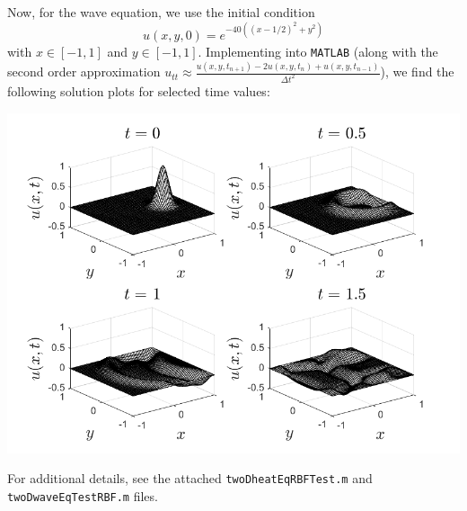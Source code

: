 \documentclass{article}
\begin{document}
\begin{itemize}
\begin{center}
    \end{center}
    Now, for the wave equation, we use the initial condition 
    \[u(x,y,0) = e^{-40((x - 1/2)^2 + y^2)}\]
    with $x \in [-1, 1]$ and $y \in [-1,1]$.
    \newline
    Implementing into \verb+MATLAB+ (along with the second order approximation $u_{tt} \approx \frac{u(x,y,t_{n+1}) - 2u(x,y,t_n) + u(x,y,t_{n-1})}{\Delta t^2}$), we find the following solution plots for selected time values:
    \begin{center}
        \includegraphics[scale = 0.5]{waveEq_RBF_PS.png}
    \end{center}
    For additional details, see the attached \verb+twoDheatEqRBFTest.m+ and \verb+twoDwaveEqTestRBF.m+ files.
\end{itemize}
\end{document}
